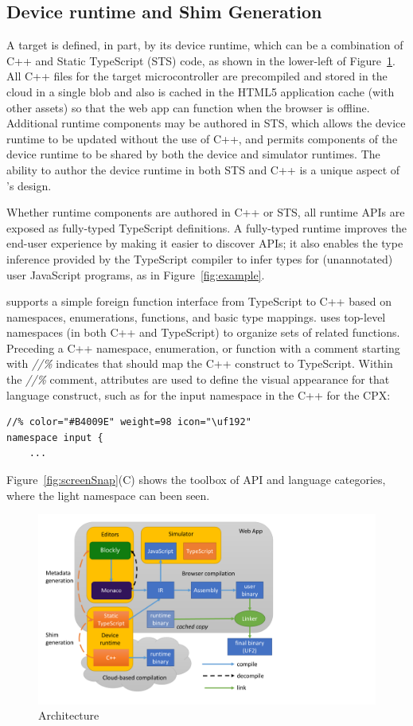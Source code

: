 \subsection{Device runtime and Shim Generation}

A \MC target is defined, in part, by its device runtime, which can be a combination of C++ 
and Static TypeScript (STS) code, as shown in the lower-left of Figure~\ref{fig:makecode}.
All C++ files for the target microcontroller are precompiled 
and stored in the cloud in a single blob and also is cached in the HTML5 application cache (with 
other assets) so that the web app can function when the browser is offline. Additional runtime
components may be authored in STS, which allows the device runtime to be updated without the
use of C++, and permits components of the device runtime to be shared by both the device
and simulator runtimes. The ability to author the device runtime in both STS and C++ is
a unique aspect of \MCN's design.

Whether runtime components are authored in C++ or STS, all runtime APIs are exposed as fully-typed
TypeScript definitions. A fully-typed runtime improves the end-user experience 
by making it easier to discover APIs; it also enables the type inference provided by the TypeScript 
compiler to infer types for (unannotated) user JavaScript programs, as in Figure~\ref{fig:example}.

\MC supports a simple foreign function interface from TypeScript to C++ based on namespaces,
enumerations, functions, and basic type mappings. \MC uses top-level namespaces (in both C++ and
TypeScript) to organize sets of related functions.  Preceding a C++ namespace, enumeration, or function
with a comment starting with \emph{//\%} indicates that \MC should map the C++ construct to TypeScript.
Within the \emph{//\%} comment, attributes are used to define the visual appearance for that
language construct, such as for the input namespace in the C++ for the CPX:
\begin{lstlisting}
//% color="#B4009E" weight=98 icon="\uf192"
namespace input {
    ...
\end{lstlisting}

Figure~\ref{fig:screenSnap}(C) shows the toolbox of API and language categories, where the light
namespace can been seen. 

\begin{figure}[t]
    \includegraphics[width=4.5in]{makecodeFig.pdf}
\caption{\label{fig:makecode}\MC Architecture}
\end{figure}


